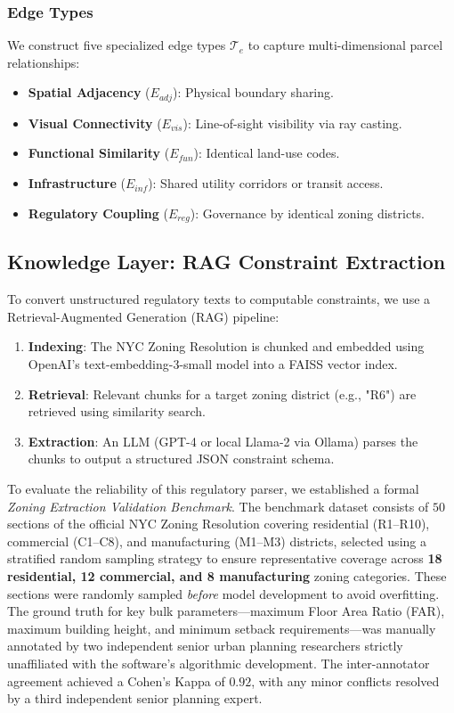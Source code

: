 \documentclass[final,3p,times]{elsarticle}
\begin{document}
\subsubsection{Edge Types}
We construct five specialized edge types $\mathcal{T}_e$ to capture multi-dimensional parcel relationships:
\begin{itemize}
    \item \textbf{Spatial Adjacency} ($E_{adj}$): Physical boundary sharing.
    \item \textbf{Visual Connectivity} ($E_{vis}$): Line-of-sight visibility via ray casting.
    \item \textbf{Functional Similarity} ($E_{fun}$): Identical land-use codes.
    \item \textbf{Infrastructure} ($E_{inf}$): Shared utility corridors or transit access.
    \item \textbf{Regulatory Coupling} ($E_{reg}$): Governance by identical zoning districts.
\end{itemize}

\subsection{Knowledge Layer: RAG Constraint Extraction}
To convert unstructured regulatory texts to computable constraints, we use a Retrieval-Augmented Generation (RAG) pipeline:
\begin{enumerate}
    \item \textbf{Indexing}: The NYC Zoning Resolution is chunked and embedded using OpenAI's text-embedding-3-small model into a FAISS vector index.
    \item \textbf{Retrieval}: Relevant chunks for a target zoning district (e.g., "R6") are retrieved using similarity search.
    \item \textbf{Extraction}: An LLM (GPT-4 or local Llama-2 via Ollama) parses the chunks to output a structured JSON constraint schema.
\end{enumerate}

To evaluate the reliability of this regulatory parser, we established a formal \textit{Zoning Extraction Validation Benchmark}. The benchmark dataset consists of $50$ sections of the official NYC Zoning Resolution covering residential (R1--R10), commercial (C1--C8), and manufacturing (M1--M3) districts, selected using a stratified random sampling strategy to ensure representative coverage across \textbf{18 residential, 12 commercial, and 8 manufacturing} zoning categories. These sections were randomly sampled \textit{before} model development to avoid overfitting. The ground truth for key bulk parameters—maximum Floor Area Ratio (FAR), maximum building height, and minimum setback requirements—was manually annotated by two independent senior urban planning researchers strictly unaffiliated with the software's algorithmic development. The inter-annotator agreement achieved a Cohen's Kappa of $0.92$, with any minor conflicts resolved by a third independent senior planning expert. 
\end{document}
